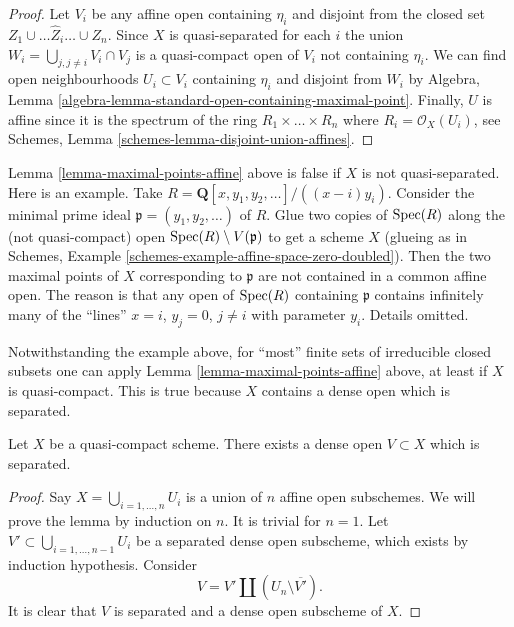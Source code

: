 \begin{proof}
Let $V_i$ be any affine open containing $\eta_i$
and disjoint from the closed set $Z_1 \cup \ldots \hat Z_i \ldots \cup Z_n$.
Since $X$ is quasi-separated for each $i$ the union
$W_i = \bigcup_{j, j \not = i} V_i \cap V_j$ is a quasi-compact
open of $V_i$ not containing $\eta_i$.
We can find open neighbourhoods $U_i \subset V_i$
containing $\eta_i$ and disjoint from $W_i$ by
Algebra, Lemma \ref{algebra-lemma-standard-open-containing-maximal-point}.
Finally, $U$ is affine since it is the spectrum of
the ring $R_1 \times \ldots \times R_n$ where $R_i = \mathcal{O}_X(U_i)$,
see Schemes, Lemma \ref{schemes-lemma-disjoint-union-affines}.
\end{proof}

\begin{remark}
\label{remark-maximal-points-affine}
Lemma \ref{lemma-maximal-points-affine} above is false if $X$
is not quasi-separated. Here is an example. Take
$R = \mathbf{Q}[x, y_1, y_2, \ldots]/((x-i)y_i)$.
Consider the minimal prime ideal $\mathfrak p = (y_1, y_2, \ldots)$
of $R$. Glue two copies of $\mathop{\mathrm{Spec}}(R)$ along the
(not quasi-compact) open $\mathop{\mathrm{Spec}}(R) \setminus V(\mathfrak p)$
to get a scheme $X$ (glueing as in
Schemes, Example \ref{schemes-example-affine-space-zero-doubled}).
Then the two maximal points of $X$ corresponding to $\mathfrak p$
are not contained in a common affine open. The reason is
that any open of $\mathop{\mathrm{Spec}}(R)$ containing $\mathfrak p$
contains infinitely many of the ``lines'' $x = i$, $y_j = 0$,
$j \not = i$ with parameter $y_i$. Details omitted.
\end{remark}

\noindent
Notwithstanding the example above, for ``most'' finite sets of irreducible
closed subsets one can apply Lemma \ref{lemma-maximal-points-affine} above,
at least if $X$ is quasi-compact. This is true because $X$ contains a dense
open which is separated.

\begin{lemma}
\label{lemma-quasi-compact-dense-open-separated}
Let $X$ be a quasi-compact scheme.
There exists a dense open $V \subset X$ which is separated.
\end{lemma}

\begin{proof}
Say $X = \bigcup_{i = 1, \ldots, n} U_i$ is a union of $n$ affine open
subschemes. We will prove the lemma by induction on $n$. It is trivial for
$n = 1$. Let $V' \subset \bigcup_{i = 1, \ldots, n - 1} U_i$ be a separated
dense open subscheme, which exists by induction hypothesis. Consider
$$
V = V' \amalg (U_n \setminus \overline{V'}).
$$
It is clear that $V$ is separated and a dense open subscheme of $X$.
\end{proof}

